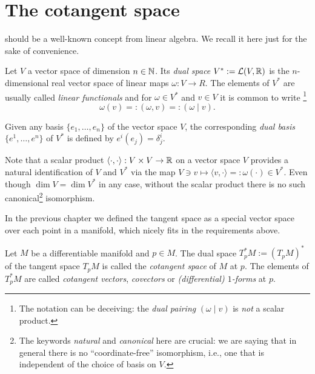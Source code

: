 \section{The cotangent space}

 should be a well-known concept from linear algebra. We recall it here just for the sake of convenience.

\begin{definition}
	Let $V$ a vector space of dimension $n\in \mathbb{N}$.
	Its \emph{dual space} $V^* := \mathcal{L}(V, \mathbb{R})$ is the $n$-dimensional real vector space of linear maps $\omega:V \to R$.
	The elements of $V^*$ are usually called \emph{linear functionals} and for $\omega\in V^*$ and $v\in V$ it is common to write
	\footnote{The notation can be deceiving: the \emph{dual pairing} $(\omega \mid v)$ is \emph{not} a scalar product.}
	\begin{equation}
		\omega(v) =: (\omega, v) =: (\omega \mid v).
	\end{equation}

	Given any basis $\{e_1, \ldots, e_n\}$ of the vector space $V$, the corresponding \emph{dual basis} $\{e^1, \ldots, e^n\}$ of $V^*$ is defined by $e^i(e_j) = \delta^i_j$.
\end{definition}

\begin{remark}\label{rmk:identification}
	Note that a scalar product $\langle\cdot, \cdot\rangle :  V\times V \to \mathbb{R}$ on a vector space $V$ provides a natural identification of $V$ and $V^*$ via the map $V\ni v \mapsto \langle v, \cdot \rangle =: \omega(\cdot) \in V^*$.
	Even though $\dim V = \dim V^*$ in any case, without the scalar product there is no such canonical\footnote{The keywords \emph{natural} and \emph{canonical} here are crucial: we are saying that in general there is no ``coordinate-free'' isomorphism, i.e., one that is independent of the choice of basis on $V$.} isomorphism.
\end{remark}

In the previous chapter we defined the tangent space as a special vector space over each point in a manifold, which nicely fits in the requirements above.

\begin{definition}
	Let $M$ be a differentiable manifold and $p\in M$.
	The dual space $T_p^*M := (T_pM)^*$ of the tangent space $T_pM$ is called the \emph{cotangent space} of $M$ at $p$.
	The elements of $T^*_pM$ are called \emph{cotangent vectors}, \emph{covectors} or \emph{(differential) $1$-forms} at $p$.
\end{definition}

